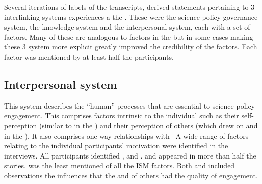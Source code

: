 


Several iterations of labels of the transcripts, derived statements pertaining to 3 interlinking systems experiences a the \SPI. These were the science-policy governance system, the knowledge system and the interpersonal system, each with a set of factors. Many of these are analogous to factors in the \ISM{} but in some cases making these 3 system more explicit greatly improved the credibility of the factors. Each factor was mentioned by at least half the participants.


\subsection{Interpersonal system}\label{sec:resinterpsyst}

This system describes the ``human'' processes that are essential to science-policy engagement. This comprises factors intrinsic to the individual such as their self-perception (similar to \ismiv{} in the \ISM) and their perception of others (which drew on \ismsn{}  and \ismst{} in the \ISM). It also comprises one-way relationships with \
A wide range of factors relating to the individual participants' motivation were identified in the interviews. All participants identified \ismiv, \ismia{} and \ismis.  \ismiv{} and \ismia{} appeared in more than half the stories. \ismic{} was the least mentioned of all the ISM factors. Both \ismis{} and \ismih{} included observations the influences that the \ismis{} and \ismih{} of others had the quality of engagement.

